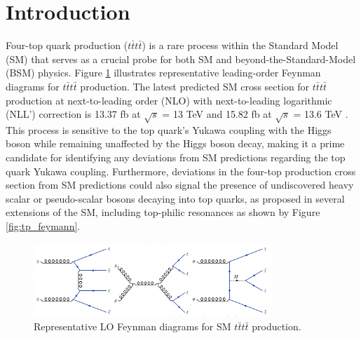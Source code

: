 \documentclass[twoside]{article}
\begin{document}
\pagestyle{fancy}
\fancyhf{}
\fancyhead[LE]{\nouppercase{\rightmark\hfill\leftmark}}
\fancyhead[RO]{\nouppercase{\leftmark\hfill\rightmark}}
\fancyfoot[LE,RO]{\hfill\thepage\hfill}


\section{Introduction}
Four-top quark production ($t\bar{t}t\bar{t}$) is a rare process within the Standard Model (SM) that serves as a crucial probe for both SM and beyond-the-Standard-Model (BSM) physics. Figure \ref{fig:ftop_feymann} illustrates representative leading-order Feynman diagrams for $t\bar{t}t\bar{t}$ production. The latest predicted SM cross section for $t\bar{t}t\bar{t}$ production at next-to-leading order (NLO) with next-to-leading logarithmic (NLL') correction is 13.37 fb at $\sqrt{s}$ = 13 TeV and 15.82 fb at $\sqrt{s}$ = 13.6 TeV \cite{ftop_xsec}. This process is sensitive to the top quark's Yukawa coupling with the Higgs boson while remaining unaffected by the Higgs boson decay, making it a prime candidate for identifying any deviations from SM predictions regarding the top quark Yukawa coupling. Furthermore, deviations in the four-top production cross section from SM predictions could also signal the presence of undiscovered heavy scalar or pseudo-scalar bosons decaying into top quarks, as proposed in several extensions of the SM, including top-philic resonances as shown by Figure \ref{fig:tp_feymann}.\\

\begin{figure}[h!]
    \centering
    \includegraphics[width=0.8\textwidth]{plots/ftop_feymann.png}
    \caption{Representative LO Feynman diagrams for SM $t\bar{t}t\bar{t}$ production.}
    \label{fig:ftop_feymann}
\end{figure}
\end{document}
